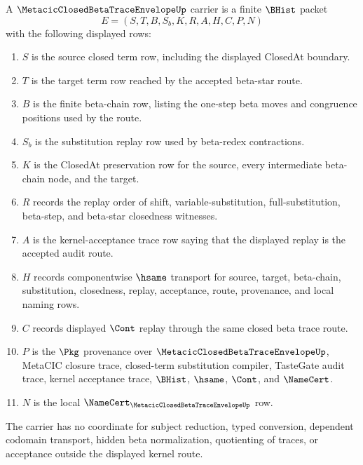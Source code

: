 \begin{definition}
\label{def:metacic-closed-beta-trace-envelope-carrier}
A $\MetacicClosedBetaTraceEnvelopeUp$ carrier is a finite $\BHist$ packet
$$
E=(S,T,B,S_b,K,R,A,H,C,P,N)
$$
with the following displayed rows:
\begin{enumerate}
\item $S$ is the source closed term row, including the displayed ClosedAt boundary.
\item $T$ is the target term row reached by the accepted beta-star route.
\item $B$ is the finite beta-chain row, listing the one-step beta moves and congruence positions used by the route.
\item $S_b$ is the substitution replay row used by beta-redex contractions.
\item $K$ is the ClosedAt preservation row for the source, every intermediate beta-chain node, and the target.
\item $R$ records the replay order of shift, variable-substitution, full-substitution, beta-step, and beta-star closedness witnesses.
\item $A$ is the kernel-acceptance trace row saying that the displayed replay is the accepted audit route.
\item $H$ records componentwise $\hsame$ transport for source, target, beta-chain, substitution, closedness, replay, acceptance, route, provenance, and local naming rows.
\item $C$ records displayed $\Cont$ replay through the same closed beta trace route.
\item $P$ is the $\Pkg$ provenance over $\MetacicClosedBetaTraceEnvelopeUp$, MetaCIC closure trace, closed-term substitution compiler, TasteGate audit trace, kernel acceptance trace, $\BHist$, $\hsame$, $\Cont$, and $\NameCert$.
\item $N$ is the local $\NameCert_{\MetacicClosedBetaTraceEnvelopeUp}$ row.
\end{enumerate}
The carrier has no coordinate for subject reduction, typed conversion, dependent codomain transport, hidden beta normalization, quotienting of traces, or acceptance outside the displayed kernel route.
\end{definition}

